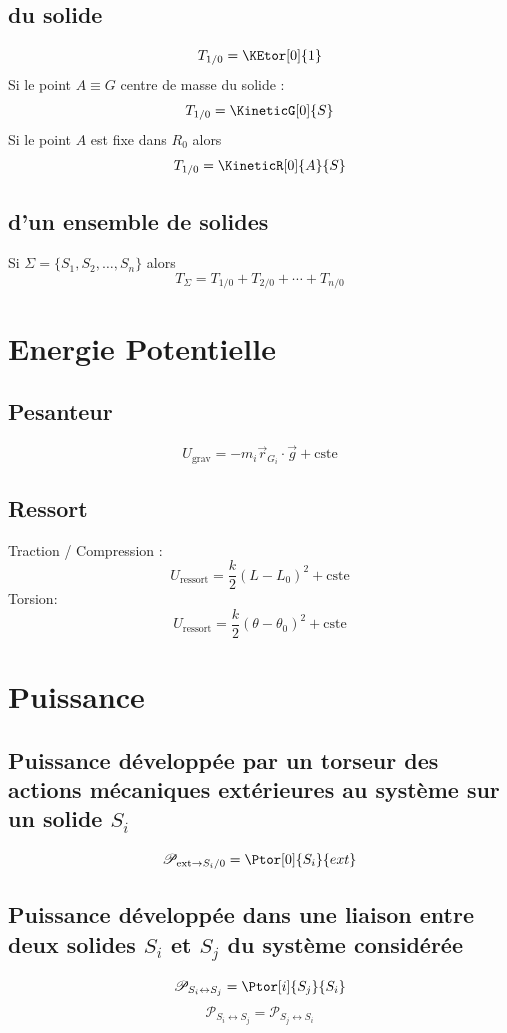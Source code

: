 \documentclass[10pt,a4paper]{article}
\renewcommand{\vec}{\overrightarrow}
\begin{document}
        \subsection*{du solide}
            $$ T_{1/0} = \KEtor[0]{1} $$
            Si le point $A \equiv G$ centre de masse du solide :
            $$ T_{1/0} = \KineticG[0]{S} $$
            Si le point $A$ est fixe dans $R_0$ alors
            $$ T_{1/0} = \KineticR[0]{A}{S} $$

        \subsection*{d'un ensemble de solides}
            Si $\Sigma = \{S_1, S_2, \ldots, S_n\}$ alors
            $$ T_\Sigma = T_{1/0} + T_{2/0} + \cdots + T_{n/0} $$

    \section{Energie Potentielle}
        \subsection*{Pesanteur}

        $$ U_{\text{grav}} = -m_i \vec r_{G_i} \cdot \vec g + \text{cste} $$

        \subsection*{Ressort}
        Traction / Compression :
        $$ U_{\text{ressort}} = \frac{k}{2} (L- L_0)^2 + \text{cste} $$
        Torsion:
        $$ U_{\text{ressort}} = \frac{k}{2} (\theta - \theta_0)^2 + \text{cste} $$

    \section{Puissance}
        \subsection*{Puissance développée par un torseur des actions mécaniques extérieures au système sur un solide $S_i$}
            $$ \mathscr{P}_{\text{ext}\rightarrow S_i/0} = \Ptor[0]{S_i}{ext} $$

        \subsection*{Puissance développée dans une liaison entre deux solides $S_i$ et $S_j$ du système considérée}
            $$ \mathscr{P}_{S_i \leftrightarrow S_j} = \Ptor[i]{S_j}{S_i} $$
            $$ \mathscr{P}_{S_i \leftrightarrow S_j} = \mathscr{P}_{S_j \leftrightarrow S_i} $$
\end{document}
